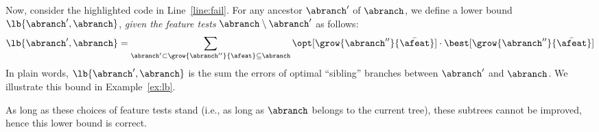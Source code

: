 \documentclass{llncs}
\begin{document}
Now, consider the highlighted code in Line~\ref{line:fail}.
For any ancestor $\abranch'$ of $\abranch$, we define a lower bound $\lb{\abranch',\abranch}$, \emph{given the feature tests} $\abranch \setminus \abranch'$ as follows:
$$
\lb{\abranch',\abranch} = \sum\limits_{\abranch' \subset \grow{\abranch''}{\afeat} \subseteq \abranch}\opt[\grow{\abranch''}{\bar{\afeat}}] \cdot \best[\grow{\abranch''}{\bar{\afeat}}]
$$
In plain words, $\lb{\abranch',\abranch}$ is the sum the errors of optimal ``sibling'' branches between $\abranch'$ and $\abranch$. We illustrate this bound in Example~\ref{ex:lb}.

As long as these choices of feature tests stand (i.e., as long as $\abranch$ belongs to the current tree), these subtrees cannot be improved, hence this lower bound is correct.


%
\end{document}

